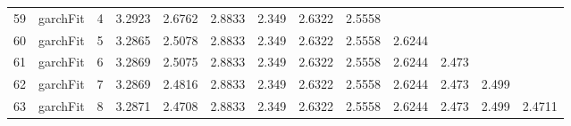 \documentclass[10pt,a4paper]{article}
\begin{document}
\begin{table}[ht]
\begin{tabular}{rlrllllllllll}
  59 & garchFit &     4 & 3.2923 & 2.6762 & 2.8833 & 2.349 & 2.6322 & 2.5558 &  &  &  &  \\ 
  60 & garchFit &     5 & 3.2865 & 2.5078 & 2.8833 & 2.349 & 2.6322 & 2.5558 & 2.6244 &  &  &  \\ 
  61 & garchFit &     6 & 3.2869 & 2.5075 & 2.8833 & 2.349 & 2.6322 & 2.5558 & 2.6244 & 2.473 &  &  \\ 
  62 & garchFit &     7 & 3.2869 & 2.4816 & 2.8833 & 2.349 & 2.6322 & 2.5558 & 2.6244 & 2.473 & 2.499 &  \\ 
  63 & garchFit &     8 & 3.2871 & 2.4708 & 2.8833 & 2.349 & 2.6322 & 2.5558 & 2.6244 & 2.473 & 2.499 & 2.4711 \\ 
   \hline
\end{tabular}
\end{table}
\end{document}
